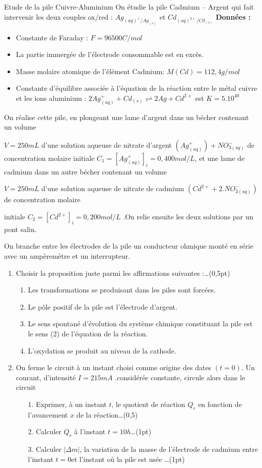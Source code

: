 \documentclass[12pt]{article}
\begin{document}
\begin{Box2}{Etude de la pile Cuivre-Aluminium}
  On étudie la pile Cadmium – Argent qui fait intervenir les deux couples ox/red : $Ag_{(aq)^+ / Ag_{(s)}}$ et $Cd_{(aq)^{2+} / Cd_{(s)}}$
	\textbf{Données :}
	\begin{itemize}
		\item Constante de Faraday : $F = 96500 C/mol$
    \item La partie immergée de l’électrode consommable est en excès.
    \item Masse molaire atomique de l’élément Cadmium: $M(Cd) = 112,4 g/mol$
		\item Constante d’équilibre associée à l’équation de la réaction entre le métal cuivre et les ions aluminium :
      $ 2Ag^+_{(aq)} + Cd_{(s)} \rightleftharpoons 2Ag + Cd^{2+}$ est $K = 5.10^{40}$
	\end{itemize}
On réalise cette pile, en plongeant une lame d’argent dans un bécher contenant un volume

$V= 250mL$ d’une solution aqueuse de nitrate d’argent $(Ag^+_{(aq)}) + NO^-_{3(aq)}$ de concentration molaire initiale 
  $C_1 = [Ag^+_{(aq)}]_i = 0,400 mol/L$, et une lame de cadmium dans un autre bécher contenant un volume

$V = 250mL$  d’une solution aqueuse de nitrate de cadmium $(Cd^{2+} + 2.NO^-_{3(aq)})$ de concentration molaire

  initiale $C_2 = [Cd^{2+}]_i = 0,200 mol/L$ .On relie ensuite les deux solutions par un pont salin.

On branche entre les électrodes de la pile un conducteur ohmique monté en série avec un ampèremètre
et un interrupteur.

\begin{enumerate}
  \item Choisir la proposition juste parmi les affirmations suivantes :\dots(0,5pt)
    \begin{enumerate}
      \item Les transformations se produisant dans les piles sont forcées.
      \item Le pôle positif de la pile est l’électrode d’argent.
      \item Le sens spontané d’évolution du système chimique constituant la pile est le sens (2) de l’équation de la réaction.
      \item L’oxydation se produit au niveau de la cathode.
    \end{enumerate}
  \item On ferme le circuit à un instant choisi comme origine des dates
    $(t=0)$. Un courant, d’intensité $I=215mA$ .considérée constante, circule alors dans le circuit
    \begin{enumerate}
      \item[1.] Exprimer, à un instant $t$, le quotient de réaction $Q_r$ en fonction de l’avancement $x$ de la réaction\dots(0,5)
      \item[2.] Calculer $Q_r$ à l’instant $t=10h$\dots(1pt)
      \item[3.] Calculer $|{\Delta{m}}|$, la variation de la masse de l’électrode de cadmium entre l’instant $t = 0$et l’instant où la pile est usée \dots{(1pt)}


\end{enumerate}
\end{enumerate}
\end{Box2}
\end{document}
